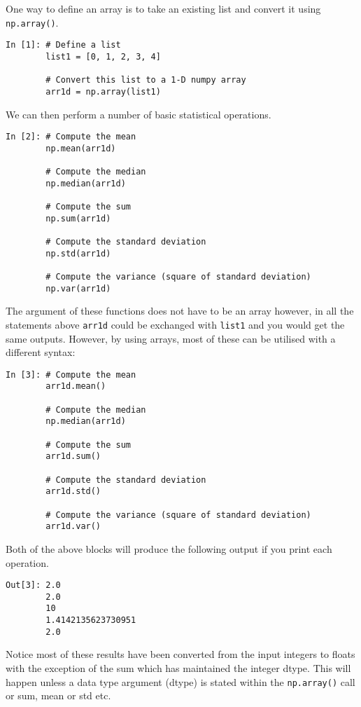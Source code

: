 One way to define an array is to take an existing list and convert it using \texttt{np.array()}.
\begin{lstlisting}[style=PY]
In [1]: # Define a list
        list1 = [0, 1, 2, 3, 4]
        
        # Convert this list to a 1-D numpy array
        arr1d = np.array(list1)
\end{lstlisting}
We can then perform a number of basic statistical operations.
\begin{lstlisting}[style=PY]
In [2]: # Compute the mean
        np.mean(arr1d)
        
        # Compute the median
        np.median(arr1d)
        
        # Compute the sum
        np.sum(arr1d)
        
        # Compute the standard deviation
        np.std(arr1d)
        
        # Compute the variance (square of standard deviation)
        np.var(arr1d)
\end{lstlisting}
The argument of these functions does not have to be an array however, in all the statements above \texttt{arr1d} could be exchanged with \texttt{list1} and you would get the same outputs. However, by using arrays, most of these can be utilised with a different syntax:
\begin{lstlisting}[style=PY]
In [3]: # Compute the mean
        arr1d.mean()
        
        # Compute the median
        np.median(arr1d)
        
        # Compute the sum
        arr1d.sum()
        
        # Compute the standard deviation
        arr1d.std()
        
        # Compute the variance (square of standard deviation)
        arr1d.var()
\end{lstlisting}
Both of the above blocks will produce the following output if you print each operation.
\begin{lstlisting}[style=PY, backgroundcolor=\color{white}]
Out[3]: 2.0
        2.0
        10
        1.4142135623730951
        2.0
\end{lstlisting}
Notice most of these results have been converted from the input integers to floats with the exception of the sum which has maintained the integer dtype. This will happen unless a data type argument (dtype) is stated within the \texttt{np.array()} call or sum, mean or std etc.\\

